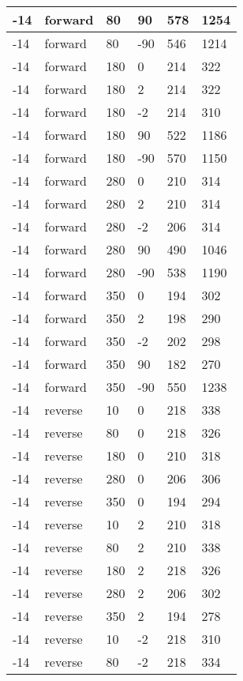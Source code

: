 \begin{table}
\begin{center}
\begin{tabular}{|l|l|l|l|l|l|}
			-14 & forward & 80 & 90 & 578 & 1254 \\
			\hline
			-14 & forward & 80 & -90 & 546 & 1214 \\
			\hline
			-14 & forward & 180 & 0 & 214 & 322 \\
			\hline
			-14 & forward & 180 & 2 & 214 & 322 \\
			\hline
			-14 & forward & 180 & -2 & 214 & 310 \\
			\hline
			-14 & forward & 180 & 90 & 522 & 1186 \\
			\hline
			-14 & forward & 180 & -90 & 570 & 1150 \\
			\hline
			-14 & forward & 280 & 0 & 210 & 314 \\
			\hline
			-14 & forward & 280 & 2 & 210 & 314 \\
			\hline
			-14 & forward & 280 & -2 & 206 & 314 \\
			\hline
			-14 & forward & 280 & 90 & 490 & 1046 \\
			\hline
			-14 & forward & 280 & -90 & 538 & 1190 \\
			\hline
			-14 & forward & 350 & 0 & 194 & 302 \\
			\hline
			-14 & forward & 350 & 2 & 198 & 290 \\
			\hline
			-14 & forward & 350 & -2 & 202 & 298 \\
			\hline
			-14 & forward & 350 & 90 & 182 & 270 \\
			\hline
			-14 & forward & 350 & -90 & 550 & 1238 \\
			\hline
			-14 & reverse & 10 & 0 & 218 & 338 \\
			\hline
			-14 & reverse & 80 & 0 & 218 & 326 \\
			\hline
			-14 & reverse & 180 & 0 & 210 & 318 \\
			\hline
			-14 & reverse & 280 & 0 & 206 & 306 \\
			\hline
			-14 & reverse & 350 & 0 & 194 & 294 \\
			\hline
			-14 & reverse & 10 & 2 & 210 & 318 \\
			\hline
			-14 & reverse & 80 & 2 & 210 & 338 \\
			\hline
			-14 & reverse & 180 & 2 & 218 & 326 \\
			\hline
			-14 & reverse & 280 & 2 & 206 & 302 \\
			\hline
			-14 & reverse & 350 & 2 & 194 & 278 \\
			\hline
			-14 & reverse & 10 & -2 & 218 & 310 \\
			\hline
			-14 & reverse & 80 & -2 & 218 & 334 \\

\end{tabular}
\end{center}
\end{table}
